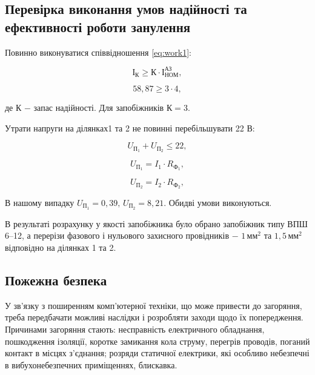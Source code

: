 \subsection{Перевірка виконання умов надійності та ефективності роботи занулення}

Повинно виконуватися співвідношення \ref{eq:work1}:

\[
	\text{І}_{\text{К}} \ge \text{К} \cdot \text{І}^{\text{АЗ}}_{\text{НОМ}},
\]

\[
	58,87 \ge 3 \cdot 4,
\]

\noindent де $\text{К}$ $-$ запас надійності. Для запобіжників $\text{К} = 3$.

\vspace{1.5em}

Утрати напруги на ділянках1 та 2 не повинні перебільшувати 22 В:

\begin{equation}\label{eq:work15}
	U_{\text{П}_{1}} + U_{\text{П}_{2}} \le 22,
\end{equation}

\begin{equation}\label{eq:work16}
	U_{\text{П}_{1}} = I_{1} \cdot R_{\text{Ф}_{1}},
\end{equation}

\begin{equation}\label{eq:work17}
	U_{\text{П}_{2}} = I_{2} \cdot R_{\text{Ф}_{2}},
\end{equation}

\vspace{1.5em}

В нашому випадку $U_{\text{П}_{1}} = 0,39, \, U_{\text{П}_{2}} = 8,21.$ Обидві умови виконуються.

В результаті розрахунку у якості запобіжника було обрано запобіжник типу ВПШ 6–12, а перерізи фазового і нульового захисного провідників $-$ $1 \, \text{мм}^{2}$ та $1,5 \, \text{мм}^{2}$ відповідно на ділянках 1 та 2.

\subsection{Пожежна безпека}

У зв’язку з поширенням комп’ютерної техніки, що може привести до загоряння, треба передбачати можливі наслідки і розробляти заходи щодо їх попередження. Причинами загоряння стають: несправність електричного обладнання, пошкодження ізоляції, коротке замикання кола струму, перегрів проводів, поганий контакт в місцях з’єднання; розряди статичної електрики, які особливо небезпечні в вибухонебезпечних приміщеннях, блискавка.

